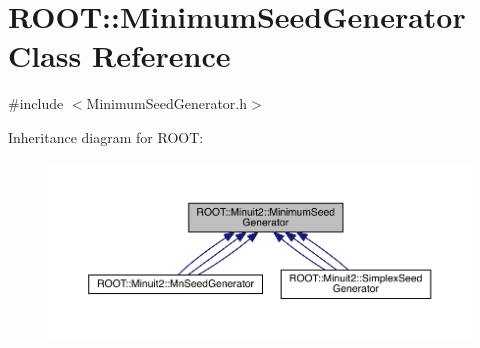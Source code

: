 \hypertarget{classROOT_1_1Minuit2_1_1MinimumSeedGenerator}{}\section{R\+O\+OT\+:\+:Minimum\+Seed\+Generator Class Reference}
\label{classROOT_1_1Minuit2_1_1MinimumSeedGenerator}


{\ttfamily \#include $<$Minimum\+Seed\+Generator.\+h$>$}



Inheritance diagram for R\+O\+OT\+:
\nopagebreak
\begin{figure}[H]
\begin{center}
\leavevmode
\includegraphics[width=350pt]{d9/d25/classROOT_1_1Minuit2_1_1MinimumSeedGenerator__inherit__graph}
\end{center}
\end{figure}
